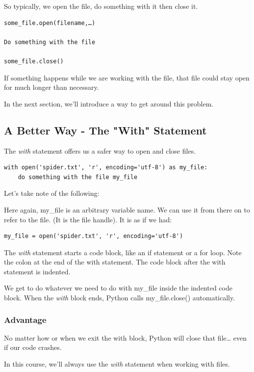 \documentclass{article}
\begin{document}
So typically, we open the file, do something with it then close it.

\begin{lstlisting}
some_file.open(filename,…)

Do something with the file

some_file.close()
\end{lstlisting}

If something happens while we are working with the file, that file could stay open for much longer than necessary.

In the next section, we'll introduce a way to get around this problem.

\subsection{A Better Way - The "With" Statement}

The \textit{with} statement offers us a safer way to open and close files.

\begin{lstlisting}
with open('spider.txt', 'r', encoding='utf-8') as my_file:
    do something with the file my_file
\end{lstlisting}

Let's take note of the following:

Here again, my{\_}file is an arbitrary variable name. We can use it  from there on to refer to the file. (It is the file handle).  It is as if we had:
 
\begin{lstlisting}
my_file = open('spider.txt', 'r', encoding='utf-8')
\end{lstlisting}
 
The \textit{with} statement starts a code block, like an if statement or a for loop.  Note the colon at the end of the with statement.  The code block after the with statement is indented.

We get to do whatever we need to do with my{\_}file inside the indented code block.
When the \textit{with} block ends, Python calls my{\_}file.close() automatically.

\subsubsection{Advantage}
No matter how or when we exit the with block, Python will close that file… even if our code crashes. 

In this course, we'll always use the \textit{with} statement when working with files.
\end{document}
